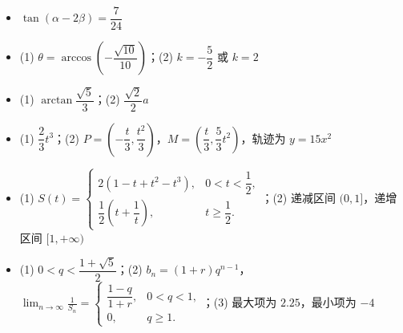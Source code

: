 \begin{itemize}[leftmargin=2.6em]
  \item[\textbf{21.}] \(\tan(\alpha-2\beta)=\dfrac7{24}\)
  \item[\textbf{22.}] (1) \(\theta=\arccos\left(-\dfrac{\sqrt{10}}{10}\right)\)；(2) \(k=-\dfrac52\) 或 \(k=2\)
  \item[\textbf{23.}] (1) \(\arctan\dfrac{\sqrt5}{3}\)；(2) \(\dfrac{\sqrt2}{2}a\)
  \item[\textbf{24.}] (1) \(\dfrac23t^3\)；(2) \(P=\left(-\dfrac t3,\dfrac{t^2}3\right)\)，\(M=\left(\dfrac t3,\dfrac53t^2\right)\)，轨迹为 \(y=15x^2\)
  \item[\textbf{25.}] (1) $S(t)=\begin{cases}2(1-t+t^2-t^3),&0<t<\dfrac12,\\[2pt]\dfrac12\left(t+\dfrac1t\right),&t\ge\dfrac12.\end{cases}$；(2) 递减区间 \((0,1]\)，递增区间 \([1,+\infty)\)
  \item[\textbf{26.}] (1) \(0<q<\dfrac{1+\sqrt5}{2}\)；(2) $b_n=(1+r)q^{n-1}$，$\displaystyle\lim_{n\to\infty}\frac1{S_n}=\begin{cases}\dfrac{1-q}{1+r},&0<q<1,\\[2pt]0,&q\ge1.\end{cases}$；(3) 最大项为 \(2.25\)，最小项为 \(-4\)
\end{itemize}

